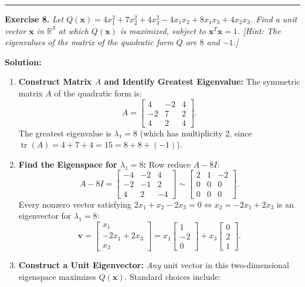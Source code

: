 \documentclass[11pt, letterpaper]{article}
\theoremstyle{definition}
\theoremstyle{remark}
\begin{document}
\medskip
\hrule
\medskip

\textbf{Exercise 8.} \emph{Let $Q(\mathbf{x}) = 4x_1^2 + 7x_2^2 + 4x_3^2 - 4x_1x_2 + 8x_1x_3 + 4x_2x_3$. Find a unit vector $\mathbf{x}$ in $\mathbb{R}^3$ at which $Q(\mathbf{x})$ is maximized, subject to $\mathbf{x}^T\mathbf{x} = 1$. [Hint: The eigenvalues of the matrix of the quadratic form $Q$ are $8$ and $-1$.]}

\textbf{Solution:}
\begin{enumerate}[label=\textbf{Step \arabic*:}]
    \item \textbf{Construct Matrix $A$ and Identify Greatest Eigenvalue:}
    The symmetric matrix $A$ of the quadratic form is:
    \[
    A = \begin{bmatrix} 4 & -2 & 4 \\ -2 & 7 & 2 \\ 4 & 2 & 4 \end{bmatrix}.
    \]
    The greatest eigenvalue is $\lambda_1 = 8$ (which has multiplicity $2$, since $\operatorname{tr}(A) = 4 + 7 + 4 = 15 = 8 + 8 + (-1)$).
    \item \textbf{Find the Eigenspace for $\lambda_1 = 8$:}
    Row reduce $A - 8I$:
    \[
    A - 8I = \begin{bmatrix} -4 & -2 & 4 \\ -2 & -1 & 2 \\ 4 & 2 & -4 \end{bmatrix} \sim \begin{bmatrix} 2 & 1 & -2 \\ 0 & 0 & 0 \\ 0 & 0 & 0 \end{bmatrix}.
    \]
    Every nonzero vector satisfying $2x_1 + x_2 - 2x_3 = 0 \iff x_2 = -2x_1 + 2x_3$ is an eigenvector for $\lambda_1 = 8$:
    \[
    \mathbf{v} = \begin{bmatrix} x_1 \\ -2x_1 + 2x_3 \\ x_3 \end{bmatrix} = x_1 \begin{bmatrix} 1 \\ -2 \\ 0 \end{bmatrix} + x_3 \begin{bmatrix} 0 \\ 2 \\ 1 \end{bmatrix}.
    \]
    \item \textbf{Construct a Unit Eigenvector:}
    \emph{Any} unit vector in this two-dimensional eigenspace maximizes $Q(\mathbf{x})$. Standard choices include:

\end{enumerate}
\end{document}
